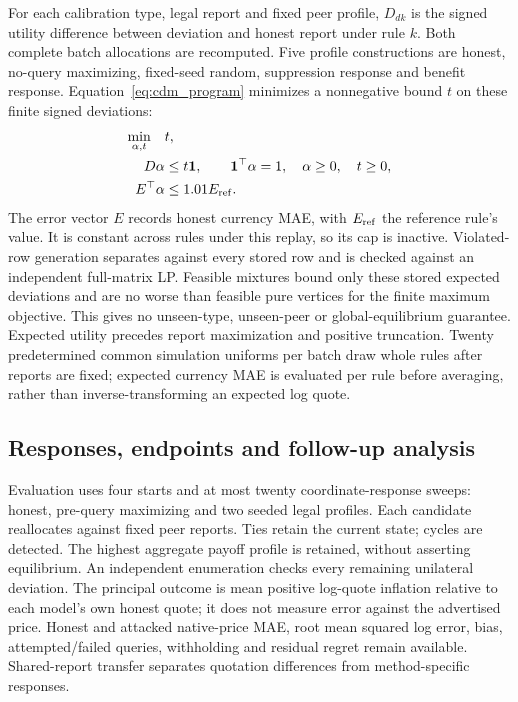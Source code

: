For each calibration type, legal report and fixed peer profile, $D_{dk}$ is
the signed utility difference between deviation and honest report under
rule $k$. Both complete batch allocations are recomputed. Five profile
constructions are honest, no-query maximizing, fixed-seed random, suppression
response and benefit response. Equation~\eqref{eq:cdm_program} minimizes
a nonnegative bound $t$ on these finite signed deviations:
\begin{equation}
\begin{aligned}
 \min_{\alpha,t}\quad&t,\\
 D\alpha&\leq t\mathbf1,\qquad\mathbf1^\top\alpha=1,\quad\alpha\geq0,\quad t\geq0,\\
 E^\top\alpha&\leq1.01E_{\rm ref}.
\end{aligned}
 \label{eq:cdm_program}
\end{equation}
The error vector $E$ records honest currency MAE, with $E_{\rm ref}$ the
reference rule's value. It is constant across rules
under this replay, so its cap is inactive. Violated-row generation separates
against every stored row and is checked against an independent full-matrix
LP. Feasible mixtures bound only these stored expected deviations and are
no worse than feasible pure vertices for the finite maximum objective.
This gives no unseen-type, unseen-peer or global-equilibrium guarantee.
Expected utility precedes report maximization and positive truncation.
Twenty predetermined common simulation uniforms per batch draw whole rules
after reports are fixed; expected currency MAE is evaluated per rule before
averaging, rather than inverse-transforming an expected log quote.

\subsection{Responses, endpoints and follow-up analysis}
Evaluation uses four starts and at most twenty coordinate-response sweeps:
honest, pre-query maximizing and two seeded legal profiles. Each candidate
reallocates against fixed peer reports. Ties retain the current state;
cycles are detected. The highest aggregate payoff profile is retained,
without asserting equilibrium. An independent enumeration checks every
remaining unilateral deviation. The principal outcome is mean positive
log-quote inflation relative to each model's own honest quote; it does not
measure error against the advertised price. Honest and attacked native-price
MAE, root mean squared log error, bias, attempted/failed queries, withholding and residual regret
remain available. Shared-report transfer separates quotation differences
from method-specific responses.

